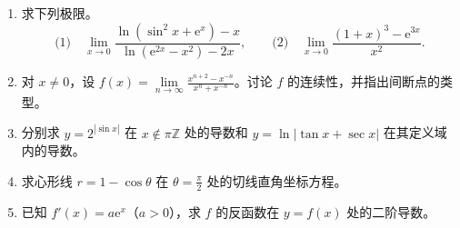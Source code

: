 \documentclass[UTF8,a4paper,zihao=-4,fontset=fandol]{ctexart}
\renewcommand{\lim}{\operatorname*{lim}\limits}
\begin{document}
\begin{enumerate}[start=50]
\item 求下列极限。
\[
 \text{(1)}\quad \lim_{x\to0}\frac{\ln(\sin^2x+\mathrm e^x)-x}{\ln(\mathrm e^{2x}-x^2)-2x},
 \qquad
 \text{(2)}\quad \lim_{x\to0}\frac{(1+x)^3-\mathrm e^{3x}}{x^2}.
\]
\item 对 $x\ne0$，设 $\displaystyle f(x)=\lim_{n\to\infty}
\frac{x^{n+2}-x^{-n}}{x^n+x^{-n}}$。讨论 $f$ 的连续性，并指出间断点的类型。
\item 分别求 $y=2^{|\sin x|}$ 在 $x\notin\pi\mathbb{Z}$ 处的导数和
$y=\ln|\tan x+\sec x|$ 在其定义域内的导数。
\item 求心形线 $r=1-\cos\theta$ 在 $\theta=\frac{\pi}{2}$ 处的切线直角坐标方程。
\item 已知 $f'(x)=a\mathrm{e}^x$（$a>0$），求 $f$ 的反函数在 $y=f(x)$ 处的二阶导数。
\end{enumerate}
\end{document}
